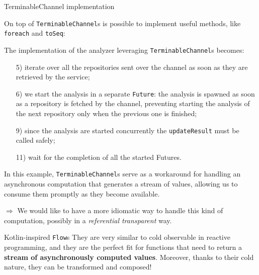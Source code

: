 \documentclass[aspectratio=1610,xcolor=dvipsnames,handout]{beamer}
\begin{document}
%
\begin{frame}{TerminableChannel implementation}
  
\end{frame}
%
\begin{frame}
  
\end{frame}
%
\begin{frame}
  \small
  On top of \texttt{TerminableChannel}s is possible to implement useful methods, like \texttt{foreach} and \texttt{toSeq}:
  
\end{frame}
%
\begin{frame}
  \small
  The implementation of the analyzer leveraging \texttt{TerminableChannel}s becomes:
  
  \footnotesize
  \begin{enumerate}
      \item[5)] iterate over all the repositories sent over the channel as soon as they are retrieved by the service;
      \item[6)] we start the analysis in a separate \texttt{Future}: the analysis is spawned as soon as a repository is fetched by the channel, preventing starting the analysis of the next repository only when the previous one is finished;
      \item[9)] since the analysis are started concurrently the \texttt{updateResult} must be called safely;
      \item[11)] wait for the completion of all the started Futures.
  \end{enumerate}
\end{frame}
%
\begin{frame}
  In this example, \texttt{TerminableChannel}s serve as a workaround for handling an asynchronous computation that generates a stream of values, allowing us to consume them promptly as they become available.
  
  \vspace*{0.5cm}
  $\Rightarrow$ We would like to have a more idiomatic way to handle this kind of computation, possibly in a \textit{referential transparent} way.

  \begin{block}{Kotlin-inspired \texttt{Flow}s}
    They are very similar to cold observable in reactive programming, and they are the perfect fit for functions that need to return a \textbf{stream of asynchronously computed values}. Moreover, thanks to their cold nature, they can be transformed and composed!
  \end{block}
\end{frame}
\end{document}
